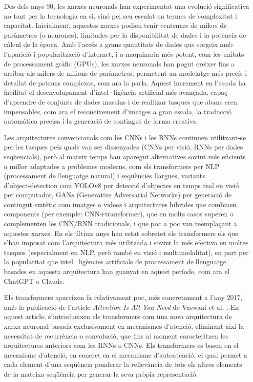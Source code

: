 \documentclass[a4paper,11pt, titlepage, twoside]{article}
\begin{document}
Des dels anys 90, les xarxes neuronals han experimentat una evolució significativa no tant per la tecnologia en si, sinó pel seu escalat en termes de complexitat i capacitat. Inicialment, aquestes xarxes podien tenir centenars de milers de paràmetres (o neurones), limitades per la disponibilitat de dades i la potència de càlcul de la època. Amb l'accés a grans quantitats de dades que sorgeix amb l'aparició i popularització d'internet, i a maquinaria més potent, com les unitats de processament gràfic (GPUs), les xarxes neuronals han pogut creixer fins a arribar als milers de milions de paràmetres, permetent un modelatge més precís i detallat de patrons complexos, com ara la parla. Aquest increment en l'escala ha facilitat el desenvolupament d'intel·ligència artificial més avançada, capaç d'aprendre de conjunts de dades massius i de realitzar tasques que abans eren impensables, com ara el reconeixement d'imatges a gran escala, la traducció automàtica precisa i la generació de contingut de forma creativa.

Les arquitectures convencionals com les CNNs i les RNNs continuen utilitzant‑se per les tasques pels quals van ser dissenyades (CNNs per visió, RNNs per dades seqüencials), però al mateix temps han aparegut alternatives sovint més eficients o millor adaptades a problemes moderns, com els transformers per NLP (processament de llenguatge natural) i seqüències llargues, variants d'object‑detection com YOLOv8 \cite{Jocher2023} per detecció d'objectes en temps real en visió per computador, GANs (Generative Adversarial Networks) \cite{Goodfellow2014} per generació de contingut sintètic com imatges o videos i arquitectures híbrides que combinen components (per exemple: CNN+transformer), que en molts casos superen o complementen les CNN/RNN tradicionals, i que poc a poc van reemplaçant a aquestes xarxes. En els últims anys han estat sobretot els transformers els que s'han imposat com l'arquitectura més utilitzada i sovint la més efectiva en moltes tasques (especialment en NLP, però també en visió i multimodalitat), en part per la popularitat que intel·ligències artificials de processament de llenguatge basades en aquesta arquitectura han guanyat en aquest període, com ara el ChatGPT o Claude.

Els transformers apareixen fa relativament poc, més concretament a l'any 2017, amb la publicació de l'article \textit{Attention Is All You Need} de Vaswani et al. \cite{VaswaniNIPS}. En aquest article, s'introdueixen els transformers com una nova arquitectura de xarxa neuronal basada exclusivament en mecanismes d'atenció, eliminant així la necessitat de recurrència o convolució, que fins al moment caracteritzen les arquitectures anteriors com les RNNs o CNNs. \newline
Els transformers es basen en el mecanisme d'atenció, en concret en el mecanisme d'autoatenció, el qual permet a cada element d'una seqüència ponderar la rellevància de tots els altres elements de la mateixa seqüència per generar la seva pròpia representació.
\end{document}
